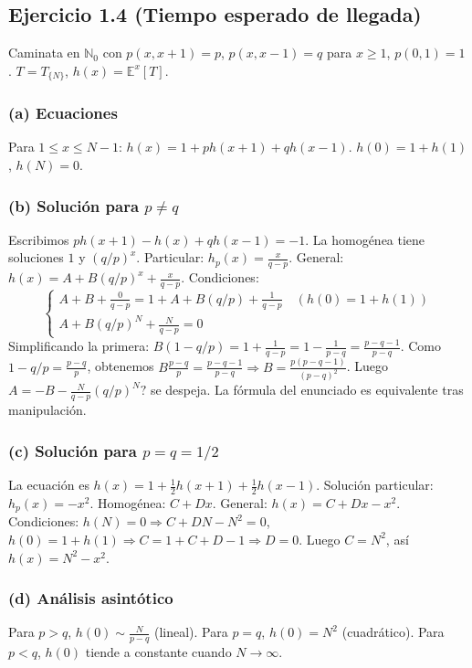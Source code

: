 \documentclass[letterpaper, 12pt]{article}
\newcommand{\E}{\mathbb{E}}
\newcommand{\N}{\mathbb{N}}
\newcommand{\1}{\mathbbm{1}}
\begin{document}
    \subsection{Ejercicio 1.4 (Tiempo esperado de llegada)}

    Caminata en $\N_0$ con $p(x,x+1)=p$, $p(x,x-1)=q$ para $x\ge1$, $p(0,1)=1$. $T=T_{\{N\}}$, $h(x)=\E^x[T]$.

    \subsubsection*{(a) Ecuaciones}
    Para $1\le x\le N-1$: $h(x)=1+ph(x+1)+qh(x-1)$. $h(0)=1+h(1)$, $h(N)=0$.

    \subsubsection*{(b) Soluci\'on para $p\neq q$}
    Escribimos $ph(x+1)-h(x)+qh(x-1)=-1$. La homog\'enea tiene soluciones $1$ y $(q/p)^x$. Particular: $h_p(x)=\frac{x}{q-p}$. General: $h(x)=A+B(q/p)^x+\frac{x}{q-p}$. Condiciones:
    \[
    \begin{cases}
    A+B+\frac{0}{q-p}=1+A+B(q/p)+\frac{1}{q-p}\quad (h(0)=1+h(1))\\
    A+B(q/p)^N+\frac{N}{q-p}=0
    \end{cases}
    \]
    Simplificando la primera: $B(1-q/p)=1+\frac1{q-p}=1-\frac1{p-q}=\frac{p-q-1}{p-q}$. Como $1-q/p=\frac{p-q}{p}$, obtenemos $B\frac{p-q}{p}=\frac{p-q-1}{p-q}\Rightarrow B=\frac{p(p-q-1)}{(p-q)^2}$. Luego $A=-B-\frac{N}{q-p}(q/p)^N?$ se despeja. La fórmula del enunciado es equivalente tras manipulación.

    \subsubsection*{(c) Soluci\'on para $p=q=1/2$}
    La ecuaci\'on es $h(x)=1+\frac12h(x+1)+\frac12h(x-1)$. Soluci\'on particular: $h_p(x)=-x^2$. Homog\'enea: $C+Dx$. General: $h(x)=C+Dx-x^2$. Condiciones:
    $h(N)=0\Rightarrow C+DN-N^2=0$, $h(0)=1+h(1)\Rightarrow C=1+C+D-1\Rightarrow D=0$. Luego $C=N^2$, así $h(x)=N^2-x^2$.

    \subsubsection*{(d) An\'alisis asint\'otico}
    Para $p>q$, $h(0)\sim\frac{N}{p-q}$ (lineal). Para $p=q$, $h(0)=N^2$ (cuadr\'atico). Para $p<q$, $h(0)$ tiende a constante cuando $N\to\infty$.
\end{document}
